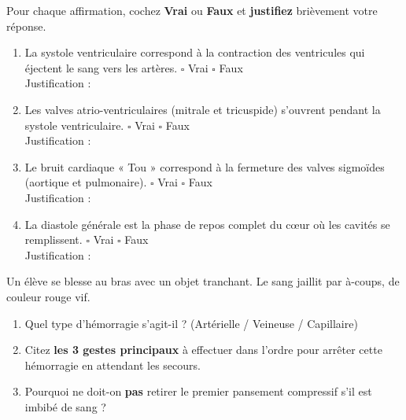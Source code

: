 \documentclass[11pt]{article}
\begin{document}
\begin{exercice}
Pour chaque affirmation, cochez \textbf{Vrai} ou \textbf{Faux} et \textbf{justifiez} brièvement votre réponse.
\begin{enumerate}
    \item La systole ventriculaire correspond à la contraction des ventricules qui éjectent le sang vers les artères. \hfill $\square$ Vrai \quad $\square$ Faux \\
    Justification : \dotfill
    \item Les valves atrio-ventriculaires (mitrale et tricuspide) s'ouvrent pendant la systole ventriculaire. \hfill $\square$ Vrai \quad $\square$ Faux \\
    Justification : \dotfill
    \item Le bruit cardiaque « Tou » correspond à la fermeture des valves sigmoïdes (aortique et pulmonaire). \hfill $\square$ Vrai \quad $\square$ Faux \\
    Justification : \dotfill
    \item La diastole générale est la phase de repos complet du cœur où les cavités se remplissent. \hfill $\square$ Vrai \quad $\square$ Faux \\
    Justification : \dotfill
\end{enumerate}
\end{exercice}

\begin{exercice}
Un élève se blesse au bras avec un objet tranchant. Le sang jaillit par à-coups, de couleur rouge vif.
\begin{enumerate}
    \item Quel type d'hémorragie s'agit-il ? (Artérielle / Veineuse / Capillaire)
    \item Citez \textbf{les 3 gestes principaux} à effectuer dans l'ordre pour arrêter cette hémorragie en attendant les secours.
    \item Pourquoi ne doit-on \textbf{pas} retirer le premier pansement compressif s'il est imbibé de sang ?
\end{enumerate}
\end{exercice}
\end{document}

